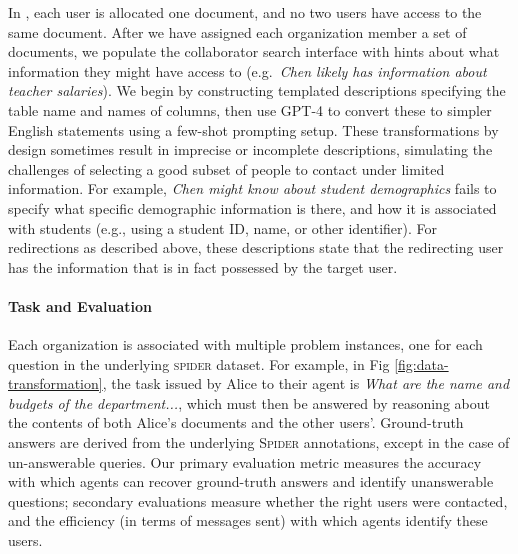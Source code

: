 \noindent{}
In \dataspider{}, each user is allocated one document, and no two users have access to the same document. 
After we have assigned each organization member a set of documents, we populate the collaborator search interface with hints about what information they might have access to (e.g.\ \emph{Chen likely has information about teacher salaries}).
We begin by constructing templated descriptions specifying the table name and names of columns, then use GPT-4 to convert these to simpler English statements using a few-shot prompting setup.%
These transformations by design sometimes result in imprecise or incomplete descriptions, simulating the challenges of selecting a good subset of people to contact under limited information.
For example, \emph{Chen might know about student demographics} fails to specify what specific demographic information is there, and how it is associated with students (e.g., using a student ID, name, or other identifier).
For redirections as described above, these descriptions state that the redirecting user has the information that is in fact possessed by the target user.





\paragraph{Task and Evaluation}

Each organization is associated with multiple problem instances, one for each question in the underlying \textsc{spider} dataset.
For example, in Fig \ref{fig:data-transformation}, the task issued by Alice  to their agent is \emph{What are the name and budgets of the department...}, which must then be answered by reasoning about the contents of both Alice's documents and the other users'. Ground-truth answers are derived from the underlying \textsc{Spider} annotations, except in the case of un-answerable queries. Our primary evaluation metric measures the accuracy with which agents can recover ground-truth answers and identify unanswerable questions; secondary evaluations measure whether the right users were contacted, and the efficiency (in terms of messages sent) with which agents identify these users.






